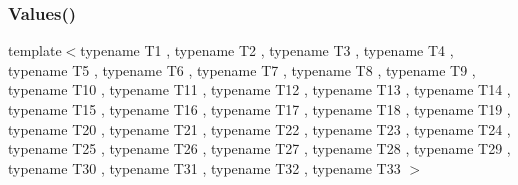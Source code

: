 \mbox{\label{namespacetesting_ac972228f2ff86974ab6591a10512326a}} 
\subsubsection{\texorpdfstring{Values()}{Values()}\hspace{0.1cm}{\footnotesize\ttfamily [33/50]}}
{\footnotesize\ttfamily template$<$typename T1 , typename T2 , typename T3 , typename T4 , typename T5 , typename T6 , typename T7 , typename T8 , typename T9 , typename T10 , typename T11 , typename T12 , typename T13 , typename T14 , typename T15 , typename T16 , typename T17 , typename T18 , typename T19 , typename T20 , typename T21 , typename T22 , typename T23 , typename T24 , typename T25 , typename T26 , typename T27 , typename T28 , typename T29 , typename T30 , typename T31 , typename T32 , typename T33 $>$ \\
}
